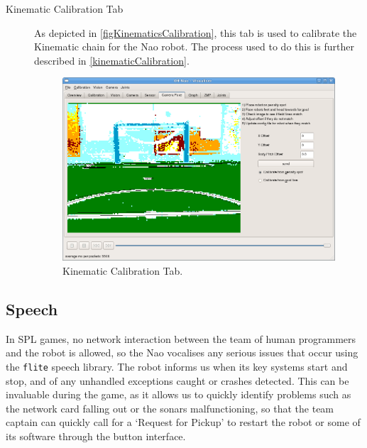 \documentclass[pdftex,11pt,a4paper]{report}
\begin{document}
\begin{description}
\item[Kinematic Calibration Tab]
As depicted in \autoref{figKinematicsCalibration}, this tab is used to
calibrate the Kinematic chain for the Nao robot. The process used to do this is
further described in \autoref{kinematicCalibration}.

\begin{figure}[ht]
\centering
\includegraphics[width=1.0\textwidth]{figures/kinematicsCalibration}
\caption{Kinematic Calibration Tab.} \label{figKinematicsCalibration}
\end{figure}



\end{description}

\subsection{Speech}
In SPL games, no network interaction between the team of human programmers
and the robot is allowed, so the Nao vocalises any serious issues that
occur using the \texttt{flite} speech library. The robot informs us when
its key systems start and stop, and of any unhandled exceptions caught or
crashes detected. This can be invaluable during the game, as it allows us
to quickly identify problems such as the network card falling out or the
sonars malfunctioning, so that the team captain can quickly call for a
`Request for Pickup' to restart the robot or some of its software through
the button interface.
\end{document}
